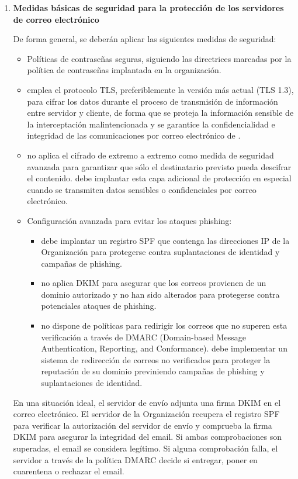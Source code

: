\begin{enumerate}[label=\alph*)]
\item \textbf{Medidas básicas de seguridad para la protección de los servidores de correo electrónico}

De forma general, se deberán aplicar las siguientes medidas de seguridad:

\begin{itemize}
    \item Políticas de contraseñas seguras, siguiendo las directrices marcadas por la política de contraseñas implantada en la organización.
    \item \Beneficiario{} emplea el protocolo TLS, preferiblemente la versión más actual (TLS 1.3), para cifrar los datos durante el proceso de transmisión de información entre servidor y cliente, de forma que se proteja la información sensible de la interceptación malintencionada y se garantice la confidencialidad e integridad de las comunicaciones por correo electrónico de \Beneficiario{}.
    \item \Beneficiario{} no aplica el cifrado de extremo a extremo como medida de seguridad avanzada para garantizar que sólo el destinatario previsto pueda descifrar el contenido. \Beneficiario{} debe implantar esta capa adicional de protección en especial cuando se transmiten datos sensibles o confidenciales por correo electrónico.
    \item Configuración avanzada para evitar los ataques phishing:
    \begin{itemize}
        \item \Beneficiario{} debe implantar un registro SPF que contenga las direcciones IP de la Organización para protegerse contra suplantaciones de identidad y campañas de phishing.
        \item \Beneficiario{} no aplica DKIM para asegurar que los correos provienen de un dominio autorizado y no han sido alterados para protegerse contra potenciales ataques de phishing.
        \item \Beneficiario{} no dispone de políticas para redirigir los correos que no superen esta verificación a través de DMARC (Domain-based Message Authentication, Reporting, and Conformance). \Beneficiario{} debe implementar un sistema de redirección de correos no verificados para proteger la reputación de su dominio previniendo campañas de phishing y suplantaciones de identidad.
    \end{itemize}
\end{itemize}

En una situación ideal, el servidor de envío adjunta una firma DKIM en el correo electrónico. El servidor de la Organización recupera el registro SPF para verificar la autorización del servidor de envío y comprueba la firma DKIM para asegurar la integridad del email. Si ambas comprobaciones son superadas, el email se considera legítimo. Si alguna comprobación falla, el servidor a través de la política DMARC decide si entregar, poner en cuarentena o rechazar el email.


\end{enumerate}
